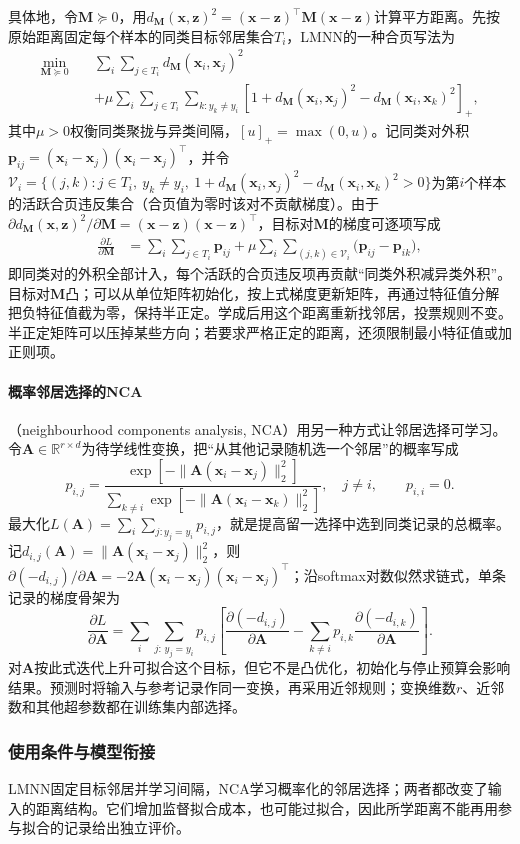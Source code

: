 具体地，令$\bm M\succeq0$，用$d_{\bm M}(\bm x,\bm z)^2=(\bm x-\bm z)^\top\bm M(\bm x-\bm z)$计算平方距离。先按原始距离固定每个样本的同类目标邻居集合$T_i$，LMNN的一种合页写法为
\[
  \begin{aligned}
    \min_{\bm M\succeq0}\quad&
      \sum_i\sum_{j\in T_i}d_{\bm M}(\bm x_i,\bm x_j)^2\\
      &+\mu\sum_i\sum_{j\in T_i}\sum_{k:y_k\ne y_i}
      [1+d_{\bm M}(\bm x_i,\bm x_j)^2-d_{\bm M}(\bm x_i,\bm x_k)^2]_+,
  \end{aligned}
\]
其中$\mu>0$权衡同类聚拢与异类间隔，$[u]_+=\max(0,u)$。记同类对外积$\bm p_{ij}=(\bm x_i-\bm x_j)(\bm x_i-\bm x_j)^{\top}$，并令$\mathcal V_i=\{(j,k):j\in T_i,\ y_k\ne y_i,\ 1+d_{\bm M}(\bm x_i,\bm x_j)^2-d_{\bm M}(\bm x_i,\bm x_k)^2>0\}$为第$i$个样本的活跃合页违反集合（合页值为零时该对不贡献梯度）。由于$\partial d_{\bm M}(\bm x,\bm z)^2/\partial\bm M=(\bm x-\bm z)(\bm x-\bm z)^{\top}$，目标对$\bm M$的梯度可逐项写成
\[
  \begin{aligned}
    \frac{\partial L}{\partial\bm M}
      &=\sum_i\sum_{j\in T_i}\bm p_{ij}
        +\mu\sum_i\sum_{(j,k)\in\mathcal V_i}\bigl(\bm p_{ij}-\bm p_{ik}\bigr),
  \end{aligned}
\]
即同类对的外积全部计入，每个活跃的合页违反项再贡献“同类外积减异类外积”。目标对$\bm M$凸；可以从单位矩阵初始化，按上式梯度更新矩阵，再通过特征值分解把负特征值截为零，保持半正定。学成后用这个距离重新找邻居，投票规则不变。半正定矩阵可以压掉某些方向；若要求严格正定的距离，还须限制最小特征值或加正则项。

\paragraph{概率邻居选择的NCA}
（neighbourhood components analysis, NCA）用另一种方式让邻居选择可学习。令$\bm A\in\mathbb R^{r\times d}$为待学线性变换，把“从其他记录随机选一个邻居”的概率写成
\[
  p_{i,j}=\frac{\exp[-\|\bm A(\bm x_i-\bm x_j)\|_2^2]}
    {\sum_{k\ne i}\exp[-\|\bm A(\bm x_i-\bm x_k)\|_2^2]},
  \quad j\ne i,\qquad p_{i,i}=0.
\]
最大化$L(\bm A)=\sum_i\sum_{j:y_j=y_i}p_{i,j}$，就是提高留一选择中选到同类记录的总概率。记$d_{i,j}(\bm A)=\|\bm A(\bm x_i-\bm x_j)\|_2^2$，则$\partial(-d_{i,j})/\partial\bm A=-2\bm A(\bm x_i-\bm x_j)(\bm x_i-\bm x_j)^{\top}$；沿softmax对数似然求链式，单条记录的梯度骨架为
\[
  \frac{\partial L}{\partial\bm A}
    =\sum_i\sum_{j:\,y_j=y_i}p_{i,j}
      \left[
        \frac{\partial(-d_{i,j})}{\partial\bm A}
        -\sum_{k\ne i}p_{i,k}\frac{\partial(-d_{i,k})}{\partial\bm A}
      \right].
\]
对$\bm A$按此式迭代上升可拟合这个目标，但它不是凸优化，初始化与停止预算会影响结果。预测时将输入与参考记录作同一变换，再采用近邻规则；变换维数$r$、近邻数和其他超参数都在训练集内部选择。

\subsubsection{使用条件与模型衔接}
LMNN固定目标邻居并学习间隔，NCA学习概率化的邻居选择；两者都改变了输入的距离结构。它们增加监督拟合成本，也可能过拟合，因此所学距离不能再用参与拟合的记录给出独立评价。
